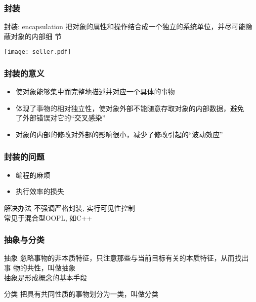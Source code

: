 \documentclass[compress]{beamer}
\begin{document}
\begin{frame}
  \frametitle{封装}
  \begin{block}{封装: encapsulation}
    把对象的属性和操作结合成一个独立的系统单位，并尽可能隐蔽对象的内部细
    节
  \end{block}
  \begin{center}
    \centering\texttt{[image: seller.pdf]}
  \end{center}
\end{frame}


\begin{frame}
  \frametitle{封装的意义}
  \begin{itemize}
    \item 使对象能够集中而完整地描述并对应一个具体的事物
    \item 体现了事物的相对独立性，使对象外部不能随意存取对象的内部数据，避免
      了外部错误对它的“交叉感染”
    \item 对象的内部的修改对外部的影响很小，减少了修改引起的“波动效应”
  \end{itemize}
\end{frame}

\begin{frame}
  \frametitle{封装的问题}
  \begin{itemize}
    \item 编程的麻烦
    \item 执行效率的损失
  \end{itemize}
  \begin{block}{解决办法}
    不强调严格封装, 实行可见性控制 \\
    常见于混合型OOPL, 如C++
  \end{block}
\end{frame}

\begin{frame}
  \frametitle{抽象与分类}
  \begin{block}{抽象}
    忽略事物的非本质特征，只注意那些与当前目标有关的本质特征，从而找出事
    物的共性，叫做抽象 \\
    抽象是形成概念的基本手段
  \end{block}
  \begin{block}{分类}
    把具有共同性质的事物划分为一类，叫做分类
  \end{block}
\end{frame}
\end{document}
